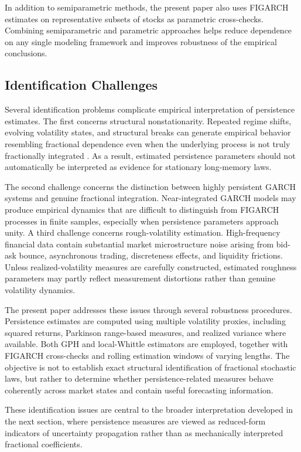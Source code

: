 \documentclass[unnumsec,webpdf,contemporary,large]{oup-authoring-template}%
\theoremstyle{thmstyleone}%
\theoremstyle{thmstyletwo}%
\theoremstyle{thmstylethree}%
\begin{document}
In addition to semiparametric methods, the present paper also uses FIGARCH
estimates on representative subsets of stocks as parametric cross-checks.
Combining semiparametric and parametric approaches helps reduce dependence
on any single modeling framework and improves robustness of the empirical
conclusions.

\subsection{Identification Challenges}

Several identification problems complicate empirical interpretation of
persistence estimates. The first concerns structural nonstationarity.
Repeated regime shifts, evolving volatility states, and structural breaks
can generate empirical behavior resembling fractional dependence even when
the underlying process is not truly fractionally integrated
\citep{mikosch2004nonstationarities}. As a result, estimated persistence
parameters should not automatically be interpreted as evidence for
stationary long-memory laws.

The second challenge concerns the distinction between highly persistent
GARCH systems and genuine fractional integration. Near-integrated GARCH
models may produce empirical dynamics that are difficult to distinguish from
FIGARCH processes in finite samples, especially when persistence parameters
approach unity. A third challenge concerns rough-volatility estimation.
High-frequency financial data contain substantial market microstructure
noise arising from bid-ask bounce, asynchronous trading, discreteness
effects, and liquidity frictions. Unless realized-volatility measures are
carefully constructed, estimated roughness parameters may partly reflect
measurement distortions rather than genuine volatility dynamics.

The present paper addresses these issues through several robustness
procedures. Persistence estimates are computed using multiple volatility
proxies, including squared returns, Parkinson range-based measures, and
realized variance where available. Both GPH and local-Whittle estimators
are employed, together with FIGARCH cross-checks and rolling estimation
windows of varying lengths. The objective is not to establish exact
structural identification of fractional stochastic laws, but rather to
determine whether persistence-related measures behave coherently across
market states and contain useful forecasting information.

These identification issues are central to the broader interpretation
developed in the next section, where persistence measures are viewed as
reduced-form indicators of uncertainty propagation rather than as
mechanically interpreted fractional coefficients.
\end{document}
